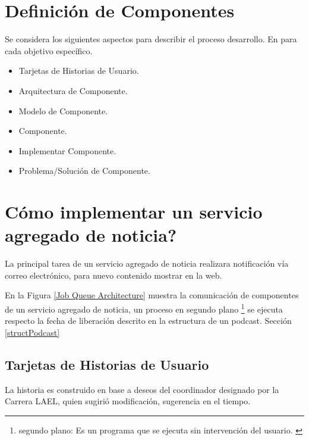 \section{Definición de Componentes}

Se considera los siguientes aspectos para describir el proceso desarrollo. 
En para cada objetivo específico.

\begin{itemize}
\item Tarjetas de Historias de Usuario.
\item Arquitectura de Componente.
\item Modelo de Componente.
\item Componente.
\item Implementar Componente.
\item Problema/Solución de Componente.
\end{itemize}

\section{\textquestiondown Cómo implementar un servicio agregado de noticia?} \label{serviceFeed}

La principal tarea de un servicio agregado de noticia realizara notificación
vía correo electrónico, para nuevo contenido mostrar en la web.

En la Figura \ref{Job Queue Architecture} muestra la comunicación de
componentes de un servicio agregado de noticia, un proceso en segundo plano 
\footnote{segundo plano: Es un programa que se ejecuta sin intervención del
usuario. \cite{background}} se ejecuta respecto la fecha de liberación
descrito en la estructura de un podcast. Sección \ref{structPodcast}


\begin{minipage}{1.0\textwidth}
	\centering
	\label{Job Queue Architecture}
\end{minipage}

\subsection{Tarjetas de Historias de Usuario}

La historia es construido en base a deseos del coordinador designado por la
Carrera LAEL, quien sugirió modificación, sugerencia en el tiempo.

